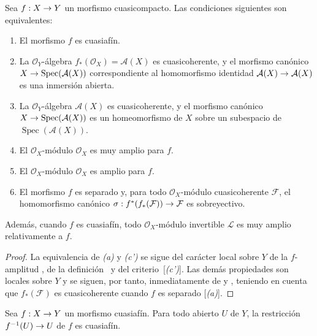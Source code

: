 \documentclass[oneside,10pt]{amsart}
\makeatletter
\newcommand{\ega@arrow}[2]{\mathchoice{#1}{#2}{#2}{#2}}
\renewcommand{\to}{\ega@arrow{\longrightarrow}{\rightarrow}}
\newcommand{\oldpage}[2][]{\marginnote{\normalfont\footnotesize\textbf{#1}~|~#2}\ignorespaces}
\let\EGAOriginalLabel\label
\renewcommand{\label}[1]{\phantomsection\EGAOriginalLabel{#1}}
\makeatother
\begin{document}
\begin{proposition}[5.1.6]
\label{II.5.1.6-fr}
Sea $f:X\to Y$ un morfismo cuasicompacto.
Las condiciones siguientes son equivalentes:
\begin{enumerate}
  \item[{\rm(a)}] El morfismo $f$ es cuasiafín.
  \item[{\rm(b)}] La $\mathcal{O}_Y$-álgebra $f_*(\mathcal{O}_X)=\mathcal{A}(X)$ es cuasicoherente, y el morfismo canónico $X\to\operatorname{Spec}(\mathcal{A}(X))$ correspondiente al homomorfismo identidad $\mathcal{A}(X)\to\mathcal{A}(X)$  es una inmersión abierta.
  \item[{\rm(b')}] La $\mathcal{O}_Y$-álgebra $\mathcal{A}(X)$ es cuasicoherente, y el morfismo canónico $X\to\operatorname{Spec}(\mathcal{A}(X))$ es un homeomorfismo de $X$ sobre un subespacio de $\operatorname{Spec}(\mathcal{A}(X))$.
  \item[{\rm(c)}] El $\mathcal{O}_X$-módulo $\mathcal{O}_X$ es muy amplio para $f$.
  \item[{\rm(c')}] El $\mathcal{O}_X$-módulo $\mathcal{O}_X$ es amplio para $f$.
  \item[{\rm(d)}] El morfismo $f$ es separado y, para todo $\mathcal{O}_X$-módulo cuasicoherente $\mathcal{F}$, el homomorfismo canónico $\sigma:f^*(f_*(\mathcal{F}))\to\mathcal{F}$  es sobreyectivo.
\end{enumerate}

Además, cuando $f$ es cuasiafín, todo $\mathcal{O}_X$-módulo invertible $\mathcal{L}$ es muy amplio relativamente a $f$.
\end{proposition}

\begin{proof}
La equivalencia de \emph{(a)} y \emph{(c')} se sigue del carácter local sobre $Y$ de la $f$-amplitud , de la definición~ y del criterio~[\emph{(c')}].
Las demás propiedades son locales sobre $Y$
\oldpage[II]{96}
y se siguen, por tanto, inmediatamente de  y , teniendo en cuenta que $f_*(\mathcal{F})$ es cuasicoherente cuando $f$ es separado [\emph{(a)}].
\end{proof}

\begin{corollary}[5.1.7]
\label{II.5.1.7-fr}
Sea $f:X\to Y$ un morfismo cuasiafín.
Para todo abierto $U$ de $Y$, la restricción $f^{-1}(U)\to U$ de $f$ es cuasiafín.
\end{corollary}
\end{document}
